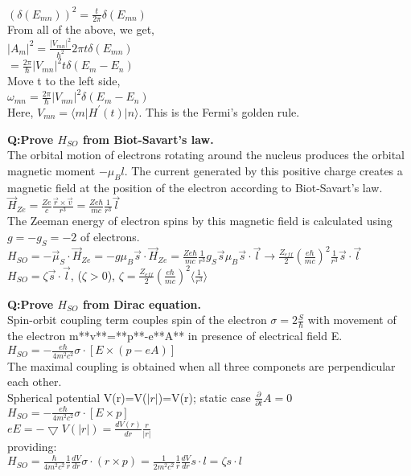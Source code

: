 \documentclass{article}
\begin{document}
\noindent $(\delta(E_{mn}))^2=\frac{t}{2\pi}\delta(E_{mn})$\\
\noindent From all of the above, we get,\\
\noindent $\lvert A_m\rvert^2=\frac{\lvert V_{mn}\rvert^2}{\hbar^2}2\pi t\delta(E_{mn})$\\
\noindent $=\frac{2\pi}{\hbar}\lvert V_{mn}\rvert^2t\delta(E_m-E_n)$\\
\noindent Move t to the left side,\\
\noindent $\omega_{mn}=\frac{2\pi}{\hbar}\lvert V_{mn}\rvert^2\delta(E_m-E_n)$\\
\noindent Here, $V_{mn}=$$\langle m\lvert H^{'}(t)\rvert n\rangle. $
\noindent This is the Fermi's golden rule.



\newpage
\noindent \textbf{Q:Prove $H_{SO}$ from Biot-Savart's law.}\\
\noindent The orbital motion of electrons rotating around the nucleus produces the orbital magnetic moment $-\mu_Bl$. The current generated by this positive charge creates a magnetic field at the position of the electron according to Biot-Savart's law.\\
\noindent $\vec{H}_{Ze}=\frac{Ze}{c}\frac{\vec{r}\times\vec{v}}{r^3}=\frac{Ze\hbar}{mc}\frac{1}{r^3}\vec{l}$\\
\noindent The Zeeman energy of electron spins by this magnetic field is calculated using $g=-g_S=-2$ of electrons.\\
\noindent $H_{SO}=-\vec{\mu}_S\cdot\vec{H}_{Ze}=-g\mu_B\vec{s}\cdot\vec{H}_{Ze}=\frac{Ze\hbar}{mc}\frac{1}{r^3}g_S\vec{s}\mu_B\vec{s}\cdot\vec{l}\rightarrow\frac{Z_{eff}}{2}(\frac{e\hbar}{mc})^2\frac{1}{r^3}\vec{s}\cdot\vec{l}$\\
\noindent $H_{SO}=\zeta\vec{s}\cdot\vec{l}$, ($\zeta>0$), $\zeta=\frac{Z_{eff}}{2}(\frac{e\hbar}{mc})^2\langle\frac{1}{r^3}\rangle$



\newpage
\noindent \textbf{Q:Prove $H_{SO}$ from Dirac equation.}\\
\noindent Spin-orbit coupling term couples spin of the electron $\sigma=2\frac{S}{\hbar}$ with movement of the electron m**v**=**p**-e**A** in presence of electrical field E.\\
\noindent $H_{SO}=-\frac{e\hbar}{4m^2c^2}\sigma\cdot[E\times(p-eA)]$\\
\noindent The maximal coupling is obtained when all three componets are perpendicular each other.\\
\noindent Spherical potential V(r)=V($\lvert r\rvert$)=V(r); static case $\frac{\partial}{\partial t}A=0$\\
\noindent $H_{SO}=-\frac{e\hbar}{4m^2c^2}\sigma\cdot[E\times p]$\\
\noindent $eE=-\bigtriangledown V(\lvert r\rvert)=\frac{dV(r)}{dr}\frac{r}{\lvert r\rvert}$\\
\noindent providing:\\
\noindent $ H_{SO}=\frac{\hbar}{4m^2c^2}\frac{1}{r}\frac{dV}{dr}\sigma\cdot(r\times p)=\frac{1}{2m^2c^2}\frac{1}{r}\frac{dV}{dr}s\cdot l=\zeta s\cdot l$
\end{document}
